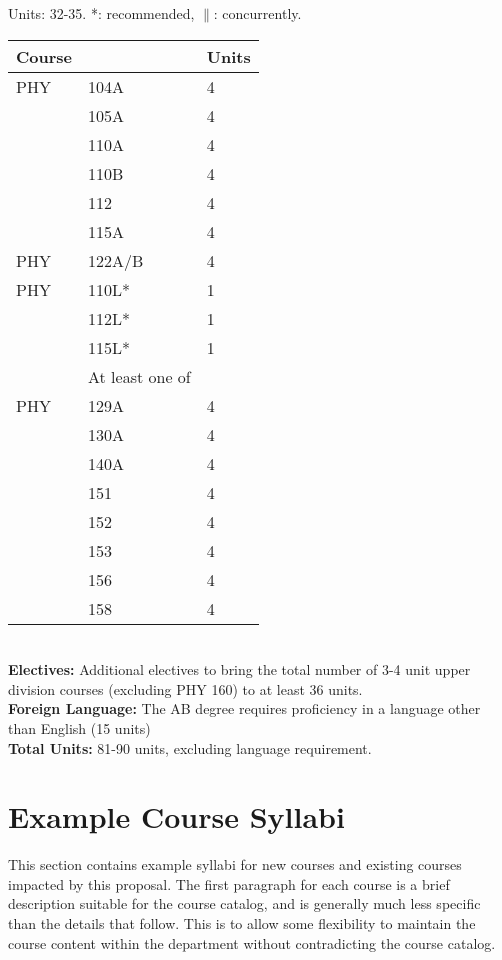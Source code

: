 \documentclass[12pt]{article}
\begin{document}
\newpage
{}
\noindent
\vskip 0.25cm
Units:  32-35. *: recommended, $\parallel$: concurrently.\\
\begin{tabular}{|lll|}
\hline
Course & & Units \\
\hline
PHY & 104A & 4 \\
    & 105A & 4 \\
    & 110A & 4 \\
    & 110B & 4 \\
    & 112  & 4 \\
    & 115A & 4 \\
\hline
PHY & 122A/B & 4 \\

\hline
PHY & 110L* & 1 \\
    & 112L* & 1 \\
    & 115L* & 1 \\
\hline
    & At least one of & \\ 
\hline
PHY & 129A & 4 \\
    & 130A & 4 \\
    & 140A & 4 \\
    & 151 & 4 \\
    & 152 & 4 \\
    & 153 & 4 \\
    & 156 & 4 \\
    & 158 & 4 \\
\hline
\end{tabular}\\ \vskip 0.25cm
\noindent
    {\bf Electives:} Additional electives to bring the total number of 3-4 unit upper division courses (excluding PHY 160) to at least 36 units. \\
    {\bf Foreign Language:} The AB degree requires proficiency in a language other than English (15 units)\\
\noindent
{\bf Total Units:} 81-90 units, excluding language requirement.

\newpage
\section{Example Course Syllabi}
\label{sec:syllabi}

This section contains example syllabi for new courses and existing
courses impacted by this proposal.  The first paragraph for each
course is a brief description suitable for the course catalog, and is
generally much less specific than the details that follow.  This is to
allow some flexibility to maintain the course content within the
department without contradicting the course catalog.
\end{document}
